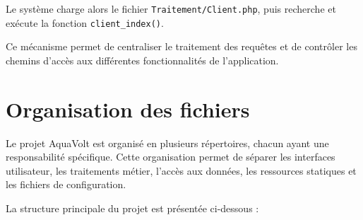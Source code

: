 Le système charge alors le fichier \texttt{Traitement/Client.php}, puis recherche et exécute la fonction \texttt{client\_index()}.

Ce mécanisme permet de centraliser le traitement des requêtes et de contrôler les chemins d'accès aux différentes fonctionnalités de l'application.

\section{Organisation des fichiers}

Le projet AquaVolt est organisé en plusieurs répertoires, chacun ayant une responsabilité spécifique. Cette organisation permet de séparer les interfaces utilisateur, les traitements métier, l'accès aux données, les ressources statiques et les fichiers de configuration.

La structure principale du projet est présentée ci-dessous :

